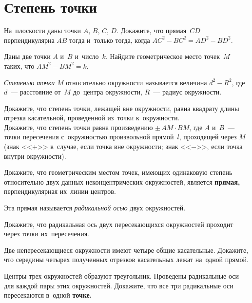 
\section*{Степень точки}


\begin{problems}

\item
На~плоскости даны точки $A$, $B$, $C$, $D$.
Докажите, что прямая~$CD$ перпендикулярна $AB$ тогда и~только тогда, когда
$AC^2 - BC^2 = AD^2 - BD^2$.

\item
Даны две точки $A$ и~$B$ и~число~$k$.
Найдите геометрическое место точек~$M$ таких, что $AM^2 - BM^2 = k$.

\end{problems}

\emph{Степенью точки} $M$ относительно окружности называется величина
$d^2 - R^2$, где $d$~--- расстояние от~$M$ до~центра окружности,
$R$~--- радиус окружности.

\begin{problems}

\item
\subproblem
Докажите, что степень точки, лежащей вне окружности, равна квадрату длины
отрезка касательной, проведенной из~точки к~окружности.
\\
\subproblem
Докажите, что степень точки равна произведению $\pm \, AM \cdot BM$, где
$A$ и~$B$~--- точки пересечения с~окружностью произвольной прямой~$l$,
проходящей через $M$ (знак <<$+$>> в~случае, если точка вне окружности;
знак <<$-$>>, если точка внутри окружности).

\item
Докажите, что геометрическим местом точек, имеющих одинаковую степень
относительно двух данных неконцентрических окружностей, является
\textbf{прямая,} перпендикулярная их~линии центров.

\end{problems}

Эта прямая называется \emph{радикальной осью} двух окружностей.

Докажите, что радикальная ось двух пересекающихся окружностей проходит через точки их~пересечения.

\begin{problems}

\item
Две непересекающиеся окружности имеют четыре общие касательные.
Докажите, что середины четырех полученных отрезков касательных лежат на~одной
прямой.

\item
Центры трех окружностей образуют треугольник.
Проведены радикальные оси для каждой пары этих окружностей.
Докажите, что все три радикальные оси пересекаются в~одной \textbf{точке.}

\end{problems}

